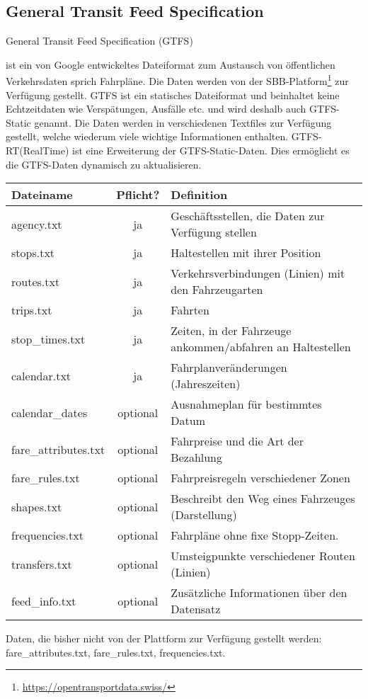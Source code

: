  

\subsection{General Transit Feed Specification}
\hypertarget{GTFS}{General Transit Feed Specification (GTFS)}\cite{gtfsinhalt}\cite{gtfs} ist ein von Google entwickeltes Dateiformat zum Austausch von öffentlichen Verkehrsdaten sprich Fahrpläne. Die Daten werden von der SBB-Platform\footnote{\url{https://opentransportdata.swiss/}} zur Verfügung gestellt. GTFS ist ein statisches Dateiformat und beinhaltet keine Echtzeitdaten wie Verspätungen, Ausfälle etc. und wird deshalb auch GTFS-Static genannt. Die Daten werden in verschiedenen Textfiles zur Verfügung gestellt, welche wiederum viele wichtige Informationen enthalten. GTFS-RT(RealTime) ist eine Erweiterung der GTFS-Static-Daten. Dies ermöglicht es die GTFS-Daten dynamisch zu aktualisieren. \cite{gtfs-rt-google} \newline

\begin{tabular}{|l|c|l|}  \hline
	Dateiname & Pflicht? & Definition \\ \hline
	agency.txt & ja & Geschäftsstellen, die Daten zur Verfügung stellen \\ \hline
	stops.txt & ja & Haltestellen mit ihrer Position \\ \hline
	routes.txt & ja & Verkehrsverbindungen (Linien) mit den Fahrzeugarten \\ \hline %
	trips.txt & ja & Fahrten  \\ \hline												%
	stop\_times.txt & ja & Zeiten, in der Fahrzeuge ankommen/abfahren an Haltestellen \\ \hline
	calendar.txt & ja & Fahrplanveränderungen (Jahreszeiten) \\ \hline
	calendar\_dates & optional & Ausnahmeplan für bestimmtes Datum \\ \hline
	fare\_attributes.txt & optional & Fahrpreise und die Art der Bezahlung \\ \hline
	fare\_rules.txt & optional & Fahrpreisregeln verschiedener Zonen  \\ \hline
	shapes.txt & optional & Beschreibt den Weg eines Fahrzeuges (Darstellung) \\ \hline
	frequencies.txt & optional & Fahrpläne ohne fixe Stopp-Zeiten. \\ \hline
	transfers.txt & optional & Umsteigpunkte verschiedener Routen (Linien) \\ \hline
	feed\_info.txt & optional & Zusätzliche Informationen über den Datensatz \\ \hline	
\end{tabular}

Daten, die bisher nicht von der Plattform zur Verfügung gestellt werden: fare\_attributes.txt, fare\_rules.txt, frequencies.txt.


